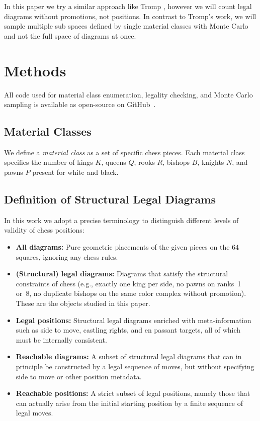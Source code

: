 \documentclass[12pt]{article}
\begin{document}
In this paper we try a similar approach like Tromp \cite{tromp2021b}, however we will count legal diagrams without promotions, not positions. In contrast to Tromp's work, we will sample multiple sub spaces defined by single material classes with Monte Carlo and not the full space of diagrams at once.


\section{Methods}
All code used for material class enumeration, legality checking, and Monte Carlo sampling 
is available as open-source on GitHub~\cite{repo}.

\subsection{Material Classes}

We define a \emph{material class} as a set of specific chess pieces. Each material class specifies the number of kings $K$, queens $Q$, rooks $R$, bishops $B$, knights $N$, and pawns $P$ present for white and black.

\subsection{Definition of Structural Legal Diagrams}

In this work we adopt a precise terminology to distinguish different levels of validity of chess positions:

\begin{itemize}
    \item \textbf{All diagrams:} Pure geometric placements of the given pieces on the $64$ squares, ignoring any chess rules.
    \item \textbf{(Structural) legal diagrams:} Diagrams that satisfy the structural constraints of chess (e.g., exactly one king per side, no pawns on ranks~1 or~8, no duplicate bishops on the same color complex without promotion). These are the objects studied in this paper.
    \item \textbf{Legal positions:} Structural legal diagrams enriched with meta-information such as side to move, castling rights, and en passant targets, all of which must be internally consistent.
    \item \textbf{Reachable diagrams:} A subset of structural legal diagrams that can in principle be constructed by a legal sequence of moves, but without specifying side to move or other position metadata.
    \item \textbf{Reachable positions:} A strict subset of legal positions, namely those that can actually arise from the initial starting position by a finite sequence of legal moves.
\end{itemize}
\end{document}
